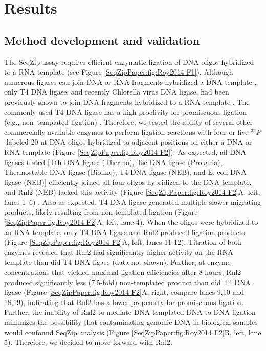 \section{Results}\label{SeqZipPaper:sec:Results}

	\subsection{Method development and validation}\label{SeqZipPaper:subsec: Method Development and Validation}

		The SeqZip assay requires efficient enzymatic ligation of DNA oligos hybridized to a RNA template (see Figure \ref{SeqZipPaper:fig:Roy2014 F1}). Although numerous ligases can join DNA or RNA fragments hybridized a DNA template \citep{Bullard2006}, only T4 DNA ligase, and recently Chlorella virus DNA ligase, had been previously shown to join DNA fragments hybridized to a RNA template \citep{Nilsson2001,Lohman2013c}. The commonly used T4 DNA ligase has a high proclivity for promiscuous ligation (e.g., non–templated ligation) \citep{Kuhn2005}. Therefore, we tested the ability of several other commercially available enzymes to perform ligation reactions with four or five $^{32}P$-labeled 20 nt DNA oligos hybridized to adjacent positions on either a DNA or RNA template (Figure \ref{SeqZipPaper:fig:Roy2014 F2}). As expected, all DNA ligases tested [Tth DNA ligase (Thermo), Tsc DNA ligase (Prokaria), Thermostable DNA ligase (Bioline), T4 DNA ligase (NEB), and E. coli DNA ligase (NEB)] efficiently joined all four oligos hybridized to the DNA template, and Rnl2 (NEB) lacked this activity (Figure \ref{SeqZipPaper:fig:Roy2014 F2}A, left, lanes 1–6) \citep{Bullard2006}. Also as expected, T4 DNA ligase generated multiple slower migrating products, likely resulting from non-templated ligation (Figure \ref{SeqZipPaper:fig:Roy2014 F2}A, left, lane 4). When the oligos were hybridized to an RNA template, only T4 DNA ligase and Rnl2 produced ligation products (Figure \ref{SeqZipPaper:fig:Roy2014 F2}A, left, lanes 11-12). Titration of both enzymes revealed that Rnl2 had significantly higher activity on the RNA template than did T4 DNA ligase (data not shown). Further, at enzyme concentrations that yielded maximal ligation efficiencies after 8 hours, Rnl2 produced significantly less (7.5-fold) non-templated product than did T4 DNA ligase (Figure \ref{SeqZipPaper:fig:Roy2014 F2}A, right, compare lanes 9,10 and 18,19), indicating that Rnl2 has a lower propensity for promiscuous ligation. Further, the inability of Rnl2 to mediate DNA-templated DNA-to-DNA ligation minimizes the possibility that contaminating genomic DNA in biological samples would confound SeqZip analysis (Figure \ref{SeqZipPaper:fig:Roy2014 F2}B, left, lane 5). Therefore, we decided to move forward with Rnl2.

